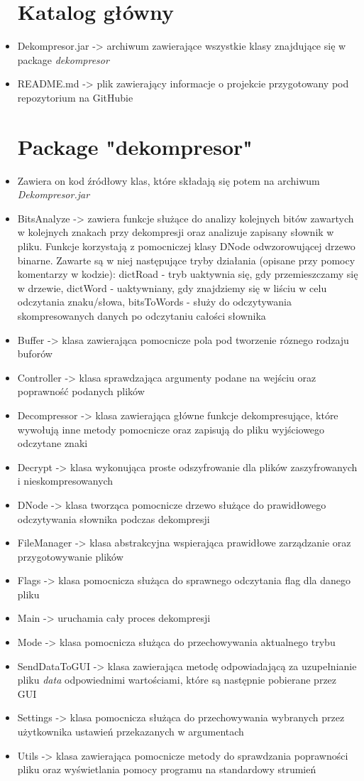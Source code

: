 \documentclass[]{article}
\begin{document}
\begin{itemize}
\section{Katalog główny}\label{header-n231}
\item Dekompresor.jar -> archiwum zawierające wszystkie klasy znajdujące się w package \textit{dekompresor}
\item README.md -> plik zawierający informacje o projekcie przygotowany pod repozytorium na GitHubie
\section{Package "dekompresor"}\label{header-n231}
\item[]
Zawiera on kod źródłowy klas, które składają się potem na archiwum \textit{Dekompresor.jar}
\item
BitsAnalyze -> zawiera funkcje służące do analizy kolejnych bitów zawartych w kolejnych znakach przy dekompresji oraz analizuje zapisany słownik w pliku. Funkcje korzystają z pomocniczej klasy DNode odwzorowującej drzewo binarne. Zawarte są w niej następujące tryby działania (opisane przy pomocy komentarzy w kodzie): dictRoad - tryb uaktywnia się, gdy przemieszczamy się w drzewie, dictWord - uaktywniany, gdy znajdziemy się w liściu w celu odczytania znaku/słowa, bitsToWords - służy do odczytywania skompresowanych danych po odczytaniu całości słownika
\item 
Buffer -> klasa zawierająca pomocnicze pola pod tworzenie róznego rodzaju buforów
\item
Controller -> klasa sprawdzająca argumenty podane na wejściu oraz poprawność podanych plików
\item
Decompressor -> klasa zawierająca główne funkcje dekompresujące, które wywołują inne metody pomocnicze oraz zapisują do pliku wyjściowego odczytane znaki
\item
Decrypt -> klasa wykonująca proste odszyfrowanie dla plików zaszyfrowanych i nieskompresowanych
\item
DNode -> klasa tworząca pomocnicze drzewo służące do prawidłowego odczytywania słownika podczas dekompresji
\item
FileManager -> klasa abstrakcyjna wspierająca prawidłowe zarządzanie oraz przygotowywanie plików
\item
Flags -> klasa pomocnicza służąca do sprawnego odczytania flag dla danego pliku
\item
Main -> uruchamia cały proces dekompresji
\item
Mode -> klasa pomocnicza służąca do przechowywania aktualnego trybu
\item
SendDataToGUI -> klasa zawierająca metodę odpowiadającą za uzupełnianie pliku \textit{data} odpowiednimi wartościami, które są następnie pobierane przez GUI
\item
Settings -> klasa pomocnicza służąca do przechowywania wybranych przez użytkownika ustawień przekazanych w argumentach
\item
Utils -> klasa zawierająca pomocnicze metody do sprawdzania poprawności pliku oraz wyświetlania pomocy programu na standardowy strumień

\end{itemize}
\end{document}
